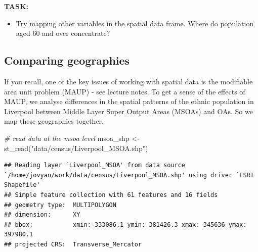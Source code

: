 \documentclass[
]{book}
\newenvironment{Shaded}{\begin{snugshade}}{\end{snugshade}}
\newcommand{\CommentTok}[1]{\textcolor[rgb]{0.56,0.35,0.01}{\textit{#1}}}
\newcommand{\FunctionTok}[1]{\textcolor[rgb]{0.00,0.00,0.00}{#1}}
\newcommand{\NormalTok}[1]{#1}
\newcommand{\OtherTok}[1]{\textcolor[rgb]{0.56,0.35,0.01}{#1}}
\newcommand{\StringTok}[1]{\textcolor[rgb]{0.31,0.60,0.02}{#1}}
\providecommand{\tightlist}{%
  \setlength{\itemsep}{0pt}\setlength{\parskip}{0pt}}
\begin{document}
\textbf{TASK:}

\begin{itemize}
\tightlist
\item
  Try mapping other variables in the spatial data frame. Where do population aged 60 and over concentrate?
\end{itemize}

\hypertarget{comparing-geographies}{%
\subsection{Comparing geographies}\label{comparing-geographies}}

If you recall, one of the key issues of working with spatial data is the modifiable area unit problem (MAUP) - see lecture notes. To get a sense of the effects of MAUP, we analyse differences in the spatial patterns of the ethnic population in Liverpool between Middle Layer Super Output Areas (MSOAs) and OAs. So we map these geographies together.

\begin{Shaded}
\begin{Highlighting}[]
\CommentTok{\# read data at the msoa level}
\NormalTok{msoa\_shp }\OtherTok{\textless{}{-}} \FunctionTok{st\_read}\NormalTok{(}\StringTok{"data/census/Liverpool\_MSOA.shp"}\NormalTok{)}
\end{Highlighting}
\end{Shaded}

\begin{verbatim}
## Reading layer `Liverpool_MSOA' from data source `/home/jovyan/work/data/census/Liverpool_MSOA.shp' using driver `ESRI Shapefile'
## Simple feature collection with 61 features and 16 fields
## geometry type:  MULTIPOLYGON
## dimension:      XY
## bbox:           xmin: 333086.1 ymin: 381426.3 xmax: 345636 ymax: 397980.1
## projected CRS:  Transverse_Mercator
\end{verbatim}
\end{document}
